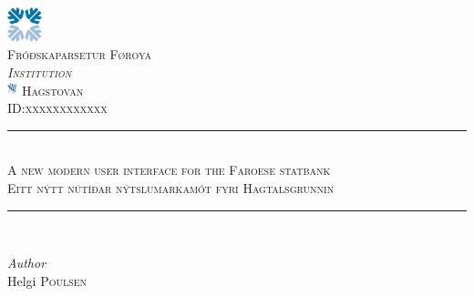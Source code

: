 
\begin{titlepage} %
	\raggedright

	\newcommand{\HRule}{\rule{\linewidth}{0.5mm}} %

	\center %
	
	
	
		\includegraphics[width = 10mm]{img/setur.jpeg}\\[4ex]
	\textsc{\LARGE Fróðskaparsetur Føroya} %
	\\[0.5cm]
	\textsc{\small\textit{Institution}}\\
			\includegraphics[width = 3mm]{img/hagstova_foroya.png}
	\textsc{\large Hagstovan} %
		\\[0.3cm]
	\textsc{\small ID:xxxxxxxxxxxx}\\[0.5cm] %
		\HRule\\[0.4cm]

\textsc{\Large A new modern user interface for the Faroese statbank}\\[0.5cm] %
	
\textsc{\normalsize Eitt nýtt nútíðar nýtslumarkamót fyri Hagtalsgrunnin}\\[0.5cm]	
	
		\HRule\\[0.4cm]

	
	
	
	\begin{minipage}{0.4\textwidth}
		\begin{center}	
			\large
			\textit{Author}\\
			Helgi \textsc{Poulsen} %
		\end{center}
	\end{minipage}
	

\end{titlepage}

